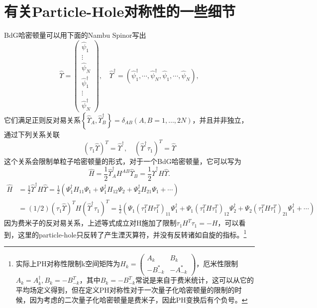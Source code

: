 \documentclass[10pt,openany]{book}
\theoremstyle{thmstyle} %
\theoremstyle{defstyle} %
\theoremstyle{prostyle} %
\begin{document}
\section{有关Particle-Hole对称性的一些细节}
BdG哈密顿量可以用下面的Nambu Spinor写出
\begin{equation}
  \hat{\Upsilon}=\left(\begin{array}{c}
    \hat{\psi}_1 \\
    \vdots \\
    \hat{\psi}_N \\
    \hat{\psi}_1^{\dagger} \\
    \vdots \\
    \hat{\psi}_N^{\dagger}
    \end{array}\right), \quad \hat{\Upsilon}^{\dagger}=\left(\hat{\psi}_1^{\dagger}, \cdots, \hat{\psi}_N^{\dagger}, \hat{\psi}_1, \cdots, \hat{\psi}_N\right),
\end{equation}
它们满足正则反对易关系$ \left\{\hat{\Upsilon}_A, \hat{\Upsilon}_B^{\dagger}\right\}=\delta_{A B}(A, B=1, \ldots, 2 N) $，并且并非独立，通过下列关系关联
\begin{equation}
  \left(\tau_1 \hat{\Upsilon}\right)^T=\hat{\Upsilon}^{\dagger}, \quad\left(\hat{\Upsilon}^{\dagger} \tau_1\right)^T=\hat{\Upsilon}
\end{equation}
这个关系会限制单粒子哈密顿量的形式，对于一个BdG哈密顿量，它可以写为
\begin{equation*}
  \hat{H}=\frac{1}{2} \hat{\Upsilon}_A^{\dagger} H^{A B} \hat{\Upsilon}_B=\frac{1}{2} \hat{\Upsilon}^{\dagger} H \hat{\Upsilon} .
\end{equation*} 
\begin{align*}
  \hat{H} &= \frac{1}{2} \hat{\Upsilon}^{\dagger} H \hat{\Upsilon} = \frac{1}{2}(\Psi_1^{\dagger}H_{11}\Psi_1+\Psi_1^{\dagger}H_{12}\Psi_2+\Psi_2^{\dagger}H_{21}\Psi_1+\cdots) \\
  &= (1 / 2)\left(\tau_1 \hat{\Upsilon}\right)^T H\left(\hat{\Upsilon}^{\dagger} \tau_1\right)^T = \frac{1}{2}(\Psi_1(\tau_1^T H \tau_1^T)_{11}\Psi_1^{\dagger}+\Psi_1(\tau_1^T H \tau_1^T)_{12}\Psi_2^{\dagger}+\Psi_2(\tau_1^T H \tau_1^T)_{21}\Psi_1^{\dagger}+\cdots)
\end{align*}
因为费米子的反对易关系，上述等式成立对H施加了限制$ \tau_1 H^T \tau_1=-H $，可以看到，这里的particle-hole只反转了产生湮灭算符，并没有反转诸如自旋的指标。\footnote{实际上PH对称性限制k空间矩阵为$ H_k=\left(\begin{array}{cc}
  A_k & B_k \\
  -B_{-k}^* & -A_{-k}^*
  \end{array}\right) $，厄米性限制$ A_k=A_k^{\dagger}, B_k=-B_{-k}^T $，其中$ B_k=-B_{-k}^T $常说是来自于费米统计，这可以从它的平均场定义得到，但在定义PH对称性对于一次量子化哈密顿量的限制的时候，因为考虑的二次量子化哈密顿量是费米子，因此PH变换后有个负号。   }\\
\end{document}
